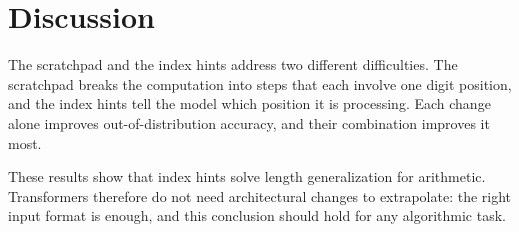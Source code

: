 \section{Discussion}
\label{sec:discussion}

The scratchpad and the index hints address two different difficulties. The scratchpad breaks the computation into steps that each involve one digit position, and the index hints tell the model which position it is processing. Each change alone improves out-of-distribution accuracy, and their combination improves it most.

These results show that index hints solve length generalization for arithmetic. Transformers therefore do not need architectural changes to extrapolate: the right input format is enough, and this conclusion should hold for any algorithmic task.

